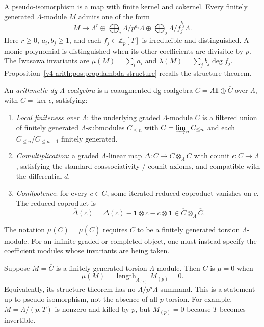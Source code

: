 A pseudo-isomorphism is a map with finite kernel and cokernel.
Every finitely generated \(\Lambda\)-module \(M\) admits one
of the form
\begin{equation}
\label{v4-arith:pos:eq:lambda-structure}
 M\longrightarrow\Lambda^r
 \oplus\bigoplus_i\Lambda/p^{a_i}\Lambda
 \oplus\bigoplus_j\Lambda/f_j^{b_j}\Lambda.
\end{equation}
Here \(r\ge0\), \(a_i,b_j\ge1\), and each \(f_j\in\mathbb Z_p[T]\)
is irreducible and distinguished.
A monic polynomial is distinguished when its other coefficients
are divisible by \(p\).
The Iwasawa invariants are
\(\mu(M)=\sum_i a_i\) and
\(\lambda(M)=\sum_j b_j\deg f_j\).
Proposition~\ref{v4-arith:pos:prop:lambda-structure}
recalls the structure theorem.

\begin{definition}
\label{v4-arith:pos:def:arith-dg-coalgebra}
An \emph{arithmetic dg \(\Lambda\)-coalgebra} is a coaugmented
dg coalgebra \(C=\Lambda\mathbf1\oplus\overline C\) over
\(\Lambda\), with \(\overline C=\ker\epsilon\), satisfying:
\begin{enumerate}
\item \emph{Local finiteness over \(\Lambda\)}: the underlying
graded \(\Lambda\)-module \(C\) is a filtered union of finitely
generated \(\Lambda\)-submodules \(C_{\leq n}\) with
\(C=\varinjlim_{n}C_{\leq n}\) and each \(C_{\leq n}/C_{\leq n-1}\)
finitely generated.
\item \emph{Comultiplication}: a graded \(\Lambda\)-linear map
\(\Delta\colon C\to C\otimes_{\Lambda}C\) with counit
\(\epsilon\colon C\to\Lambda\), satisfying the standard
coassociativity / counit axioms, and compatible with the
differential \(d\).
\item \emph{Conilpotence}: for every \(c\in\overline C\), some
iterated reduced coproduct vanishes on \(c\). The reduced coproduct is
\[
 \overline\Delta(c)=\Delta(c)-\mathbf1\otimes c-c\otimes\mathbf1
 \in\overline C\otimes_\Lambda\overline C.
\]
\end{enumerate}
The notation \(\mu(C)=\mu(\overline C)\) requires
\(\overline C\) to be a finitely generated torsion
\(\Lambda\)-module. For an infinite graded or completed object,
one must instead specify the coefficient modules whose invariants
are being taken.
\end{definition}

\begin{definition}[\(\mu=0\) arithmetic \(\Lambda\)-coalgebra]
\label{v4-arith:pos:def:mu-zero}
Suppose \(M=\overline C\) is a finitely generated torsion
\(\Lambda\)-module. Then \(C\) is \emph{\(\mu=0\)} when
\[
 \mu(M)=\operatorname{length}_{\Lambda_{(p)}}M_{(p)}=0.
\]
Equivalently, its structure theorem has no
\(\Lambda/p^a\Lambda\) summand. This is a statement up to
pseudo-isomorphism, not the absence of all \(p\)-torsion.
For example, \(M=\Lambda/(p,T)\) is nonzero and killed by \(p\),
but \(M_{(p)}=0\) because \(T\) becomes invertible.
\end{definition}

